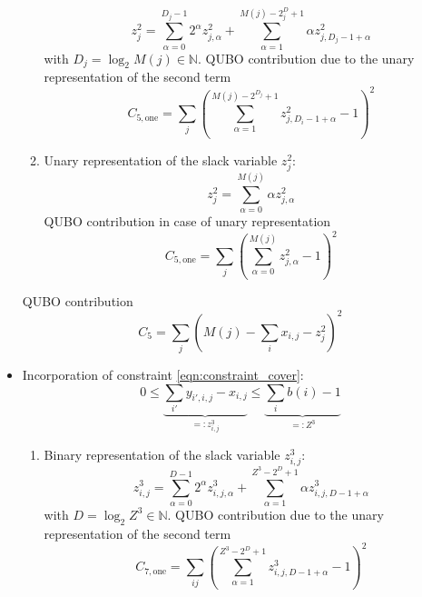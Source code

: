 \documentclass{article}
\begin{document}
\begin{itemize}
\begin{enumerate}
\begin{equation*}
            z^2_{j} = \sum_{\alpha = 0}^{D_j - 1} 2^\alpha z^2_{j, \alpha} + \sum_{\alpha=1}^{M(j) - 2^D_j + 1} \alpha z^2_{j,  D_j -1 + \alpha}
        \end{equation*}
        with $D_j = \log_2 M(j) \in \mathbb{N}$.
        QUBO contribution due to the unary representation of the second term
        \begin{equation*}
            C_{5, \text{one}} = \sum_{j} \left( \sum_{\alpha = 1}^{M(j) - 2^{D_j} + 1} z^2_{j, D_i -1 + \alpha} - 1 \right)^2
        \end{equation*}
        \item 
        Unary representation of the slack variable $z^2_j$:
        \begin{equation*}
            z^2_{j} = \sum_{\alpha = 0}^{M(j)} \alpha z^2_{j, \alpha}
        \end{equation*}
        QUBO contribution in case of unary representation
        \begin{equation*}
            C_{5, \text{one}} = \sum_{j} \left( \sum_{\alpha = 0}^{M(j)} z^2_{j, \alpha} - 1 \right)^2
        \end{equation*}
    \end{enumerate}
    QUBO contribution
    \begin{equation*}
        C_5 = \sum_j \left( M(j) - \sum_i x_{i,j} -  z^2_j \right)^2
    \end{equation*}
\item Incorporation of constraint \eqref{eqn:constraint_cover}:
    \begin{equation*}
        0 \leq \underbrace{\sum_{i'} y_{i', i, j} - x_{i, j}}_{=:z^3_{i, j}} \leq \underbrace{\sum_i b(i) - 1}_{=:Z^3}
    \end{equation*}
    \begin{enumerate}
        \item 
        Binary representation of the slack variable $z^3_{i, j}$:
        \begin{equation*}
            z^3_{i, j} = \sum_{\alpha = 0}^{D - 1} 2^\alpha z^3_{i, j, \alpha} + \sum_{\alpha=1}^{Z^3 - 2^D + 1} \alpha z^3_{i, j,  D -1 + \alpha} 
        \end{equation*}
        with $D = \log_2 Z^3 \in \mathbb{N}$.
        QUBO contribution due to the unary representation of the second term
        \begin{equation*}
            C_{7, \text{one}} = \sum_{ij} \left( \sum_{\alpha = 1}^{Z^3 - 2^{D} + 1} z^3_{i, j, D - 1 + \alpha} - 1 \right)^2
        \end{equation*}

\end{enumerate}
\end{itemize}
\end{document}
